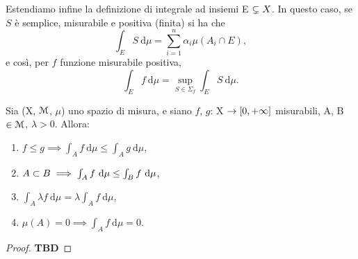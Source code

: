 \documentclass[Completo.tex]{subfiles}
\begin{document}
	\begin{Def}
		Estendiamo infine la definizione di integrale ad insiemi E $\subsetneq X$. In questo caso, se $S$ è semplice, misurabile e positiva (finita) si ha che
		\begin{equation*}
		\int_E S \ \mathrm{d}\mu = \sum_{i = 1}^{n} \alpha_i \mu(A_i \cap E),
		\end{equation*}
		e così, per $f$ funzione misurabile positiva,
		\begin{equation*}
		\int_E f \ \mathrm{d}\mu = \sup\limits_{S \in \Sigma_f} \int_E S \ \mathrm{d}\mu.
		\end{equation*}
	\end{Def}
	\begin{Prop}
		Sia (X, $\eu[M]$, $\mu$) uno spazio di misura, e siano $f$, $g$: X $\rightarrow [0, +\infty]$ misurabili, A, B $\in \eu[M]$, $\lambda > 0$. Allora:
		\begin{enumerate}
			\item $f \leq g \implies \int_A f \ \mathrm{d}\mu \leq \int_A g \ \mathrm{d}\mu$,
			\item $A \sset B \implies \int_A f \ \mathrm{d}\mu \leq \int_B f \ \mathrm{d}\mu$,
			\item $\int_A \lambda f \ \mathrm{d}\mu = \lambda \int_A f \ \mathrm{d}\mu$,
			\item $\mu(A) = 0 \implies \int_A f \ \mathrm{d}\mu = 0$.
		\end{enumerate}
	\end{Prop}
	\begin{proof}
		\textbf{TBD}
	\end{proof}
\end{document}
